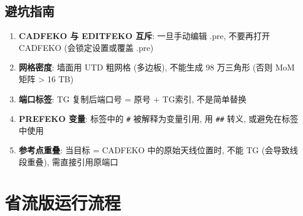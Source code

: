 \documentclass[12pt,a4paper]{ctexart}
\begin{document}
\subsection{避坑指南}

\begin{enumerate}[itemsep=3pt]
    \item \textbf{CADFEKO 与 EDITFEKO 互斥}: 一旦手动编辑 .pre, 不要再打开 CADFEKO (会锁定设置或覆盖 .pre)
    \item \textbf{网格密度}: 墙面用 UTD 粗网格 (多边板), 不能生成 98 万三角形 (否则 MoM 矩阵 > 16 TB)
    \item \textbf{端口标签}: TG 复制后端口号 = 原号 + TG索引, 不是简单替换
    \item \textbf{PREFEKO 变量}: 标签中的 \texttt{\#} 被解释为变量引用, 用 \texttt{\#\#} 转义, 或避免在标签中使用
    \item \textbf{参考点重叠}: 当目标 = CADFEKO 中的原始天线位置时, 不能 TG (会导致线段重叠), 需直接引用原端口
\end{enumerate}

\section{省流版运行流程}

\begin{center}
\end{center}
\end{document}
